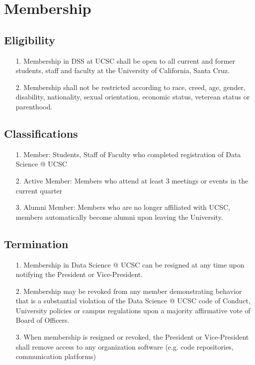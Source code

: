 \documentclass{article}
\begin{document}
\section{Membership}
\subsection{Eligibility}

\begin{itemize}

\item[1.] Membership in DSS at UCSC shall be open to all current and former students, staff and faculty at the University of California, Santa Cruz.
\item[2.] Membership shall not be restricted according to race, creed, age, gender, disability, nationality, sexual orientation, economic status, veterean status or parenthood.

\end{itemize} 

\subsection{Classifications}

\begin{itemize}

\item[1.] Member: Students, Staff of Faculty who completed registration of Data Science @ UCSC
\item[2.] Active Member: Members who attend at least 3 meetings or events in the current quarter
\item[3.] Alumni Member: Members who are no longer affiliated with UCSC, members automatically become alumni upon leaving the University. 
    
\end{itemize}

\subsection{Termination}

\begin{itemize}
    
\item[1.] Membership in Data Science @ UCSC can be resigned at any time upon notifying the 
President or Vice-President.
\item[2.] Membership may be revoked from any member demonstrating behavior that is a 
substantial  violation of the Data Science @ UCSC code of Conduct, University policies or campus 
regulations upon a majority affirmative vote of Board of Officers. 
\item[3.] When membership is resigned or revoked, the President or Vice-President shall remove
access to any organization software (e.g. code repositories, communication platforms)  
  
\end{itemize}
\end{document}
